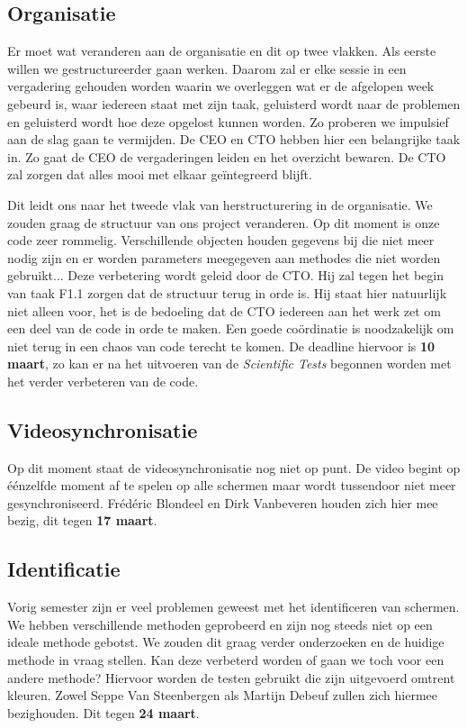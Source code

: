 \documentclass[a4paper,11pt]{article}
\begin{document}
\subsection{Organisatie}
Er moet wat veranderen aan de organisatie en dit op twee vlakken. Als eerste willen we gestructureerder gaan werken. Daarom zal er elke sessie in een vergadering gehouden worden waarin we overleggen wat er de afgelopen week gebeurd is, waar iedereen staat met zijn taak, geluisterd wordt naar de problemen en geluisterd wordt hoe deze opgelost kunnen worden. Zo proberen we impulsief aan de slag gaan te vermijden. De CEO en CTO hebben hier een belangrijke taak in. Zo gaat de CEO de vergaderingen leiden en het overzicht bewaren. De CTO zal zorgen dat alles mooi met elkaar geïntegreerd blijft.

Dit leidt ons naar het tweede vlak van herstructurering in de organisatie. We zouden graag de structuur van ons project veranderen. Op dit moment is onze code zeer rommelig. Verschillende objecten houden gegevens bij die niet meer nodig zijn en er worden parameters meegegeven aan methodes die niet worden gebruikt... Deze verbetering wordt geleid door de CTO. Hij zal tegen het begin van taak F1.1 zorgen dat de structuur terug in orde is. Hij staat hier natuurlijk niet alleen voor, het is de bedoeling dat de CTO iedereen aan het werk zet om een deel van de code in orde te maken. Een goede coördinatie is noodzakelijk om niet terug in een chaos van code terecht te komen. De deadline hiervoor is {\bf 10 maart}, zo kan er na het uitvoeren van de {\it Scientific Tests} begonnen worden met het verder verbeteren van de code.

\subsection{Videosynchronisatie}
Op dit moment staat de videosynchronisatie nog niet op punt. De video begint op éénzelfde moment af te spelen op alle schermen maar wordt tussendoor niet meer gesynchroniseerd. Frédéric Blondeel en Dirk Vanbeveren houden zich hier mee bezig, dit tegen {\bf 17 maart}.

\subsection{Identificatie}
Vorig semester zijn er veel problemen geweest met het identificeren van schermen. We hebben verschillende methoden geprobeerd en zijn nog steeds niet op een ideale methode gebotst. We zouden dit graag verder onderzoeken en de huidige methode in vraag stellen. Kan deze verbeterd worden of gaan we toch voor een andere methode? Hiervoor worden de testen gebruikt die zijn uitgevoerd omtrent kleuren. Zowel Seppe Van Steenbergen als Martijn Debeuf zullen zich hiermee bezighouden. Dit tegen {\bf 24 maart}.
\end{document}
